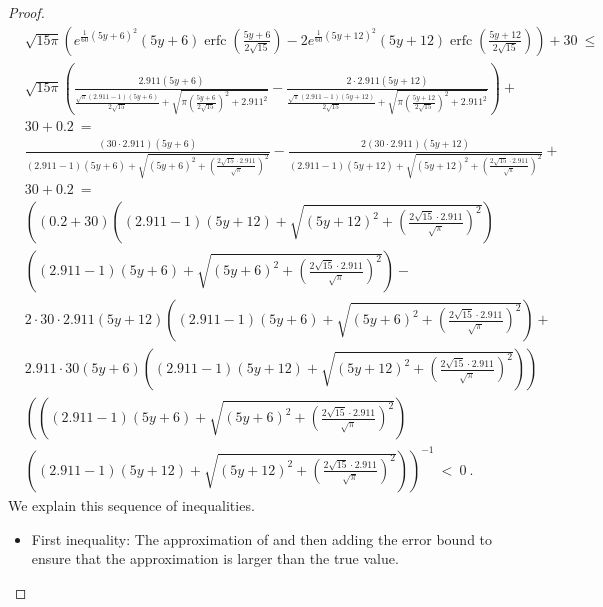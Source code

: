 \documentclass{article}
\renewcommand{\leq}{\leqslant}
\DeclareMathOperator{\erfc}{erfc}
\begin{document}
\begin{proof}
\begin{align}
\label{eq:ineqY}
&\sqrt{15 \pi } \left(e^{\frac{1}{60} (5 y+6)^2} (5 y+6) \erfc \left(\frac{5 y+6}{2 \sqrt{15}}\right)-2 e^{\frac{1}{60} (5 y+12)^2} (5 y+12) \erfc \left(\frac{5 y+12}{2 \sqrt{15}}\right)\right)+30\ \leq \\ \nonumber & \sqrt{15 \pi } \left(\frac{2.911 (5 y+6)}{\frac{\sqrt{\pi } (2.911 -1) (5 y+6)}{2 \sqrt{15}}+\sqrt{\pi  \left(\frac{5 y+6}{2 \sqrt{15}}\right)^2+2.911^2}}-\frac{2 \cdot 2.911 (5 y+12)}{\frac{\sqrt{\pi } (2.911 -1) (5 y+12)}{2 \sqrt{15}}+\sqrt{\pi  \left(\frac{5 y+12}{2 \sqrt{15}}\right)^2+2.911^2}}\right)+\\ \nonumber &30+0.2\ = \\ \nonumber &\frac{(30 \cdot 2.911) (5 y+6)}{(2.911 -1) (5 y+6)+\sqrt{(5 y+6)^2+\left(\frac{2 \sqrt{15} \cdot 2.911}{\sqrt{\pi }}\right)^2}}-\frac{2 (30 \cdot 2.911) (5 y+12)}{(2.911 -1) (5 y+12)+\sqrt{(5 y+12)^2+\left(\frac{2 \sqrt{15} \cdot 2.911}{\sqrt{\pi }}\right)^2}}+\\ \nonumber &30+0.2\ = \\ \nonumber &\left((0.2 +30) \left((2.911 -1) (5 y+12)+\sqrt{(5 y+12)^2+\left(\frac{2 \sqrt{15} \cdot 2.911}{\sqrt{\pi }}\right)^2}\right) \right.  \\ \nonumber &\left.  \left((2.911 -1) (5 y+6)+\sqrt{(5 y+6)^2+\left(\frac{2 \sqrt{15} \cdot 2.911}{\sqrt{\pi }}\right)^2}\right)-\right.  \\ \nonumber &\left.2 \cdot  30 \cdot 2.911 (5 y+12) \left((2.911 -1) (5 y+6)+\sqrt{(5 y+6)^2+\left(\frac{2 \sqrt{15} \cdot 2.911}{\sqrt{\pi }}\right)^2}\right)+\right.  \\ \nonumber &\left. 2.911 \cdot 30 (5 y+6) \left((2.911 -1) (5 y+12)+\sqrt{(5 y+12)^2+\left(\frac{2 \sqrt{15} \cdot 2.911}{\sqrt{\pi }}\right)^2}\right)\right)\\ \nonumber &\left(\left((2.911 -1) (5 y+6)+\sqrt{(5 y+6)^2+\left(\frac{2 \sqrt{15} \cdot 2.911}{\sqrt{\pi }}\right)^2}\right) \right.  \\ \nonumber &\left.\left((2.911 -1) (5 y+12)+\sqrt{(5 y+12)^2+\left(\frac{2 \sqrt{15} \cdot 2.911}{\sqrt{\pi }}\right)^2}\right)\right)^{-1} \ < \ 0 \ .
\end{align}
We explain this sequence of inequalities.
\begin{itemize}
\item First inequality: The approximation of \citet{Ren:07}
and then adding the error bound to ensure that the approximation
is larger than the true value.


\end{itemize}
\end{proof}
\end{document}

